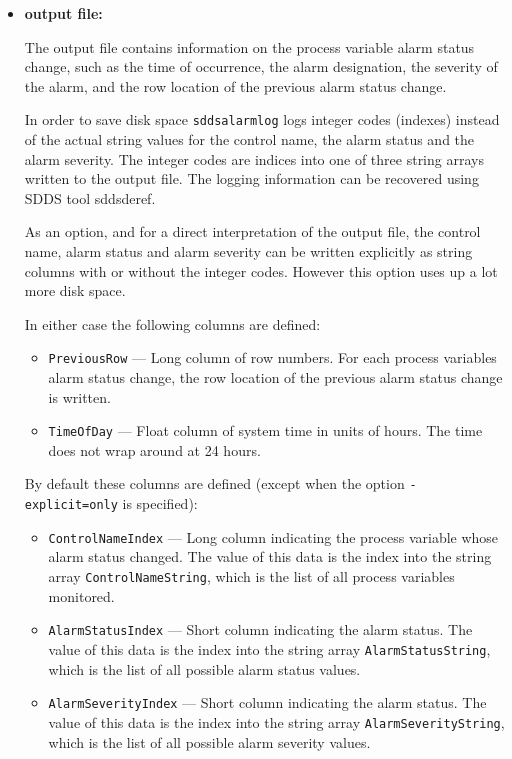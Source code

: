 \begin{itemize}
\begin{itemize}
\item {\bf output file:}\par
The output file contains information on the process variable alarm status
change, such as the time of occurrence, the alarm designation, the severity of the alarm, and the
row location of the previous alarm status change.

In order to save disk space {\tt sddsalarmlog} logs integer codes
(indexes) instead of the actual string values for the control name,
the alarm status and the alarm severity. The integer codes are indices
into one of three string arrays written to the output file. The logging information
can be recovered using SDDS tool sddsderef. 

As an option, and for a direct interpretation of the output file, the control
name, alarm status and alarm severity can be written explicitly as
string columns with or without the integer codes. However this
option uses up a lot more disk space.

In either case the following columns are defined:
\begin{itemize}
        \item {\tt PreviousRow} --- Long column of row numbers. For each 
        process variables alarm status change, the row location of the 
        previous alarm status change is written.                
        \item {\tt TimeOfDay} --- Float column of system time in units of hours. 
        The time does not wrap around at 24 hours.
\end{itemize}

By default these columns are defined (except when the option {\tt -explicit=only} is specified):
\begin{itemize}
        \item {\tt ControlNameIndex} --- Long column indicating the process variable whose
        alarm status changed. The value of this data is the index into the string array 
        {\tt ControlNameString}, which is the list of all process variables monitored.
        \item {\tt AlarmStatusIndex} --- Short column indicating the alarm status.
         The value of this data is the index into the string array 
        {\tt AlarmStatusString}, which is the list of all possible alarm status values.
        \item {\tt AlarmSeverityIndex} --- Short column indicating the alarm status.
        The value of this data is the index into the string array 
        {\tt AlarmSeverityString}, which is the list of all possible alarm severity values.
\end{itemize}


\end{itemize}
\end{itemize}

